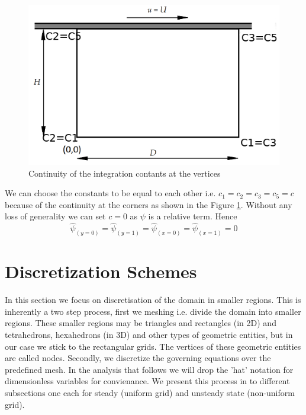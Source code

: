 \documentclass{article}
\begin{document}
\begin{figure}[h!]
\centering
\includegraphics[scale=.4]{cavityFig2.png}
\caption{Continuity of the integration contants at the vertices}
\label{fig:cavityFig2}
\end{figure}

We can choose the constants to be equal to each other i.e.  $c_1=c_2=c_3=c_5=c$ because of the continuity at the corners as shown in the Figure \ref{fig:cavityFig2}. Without any loss of generality we can set $c=0$ as $\psi$ is a relative term.
Hence
\begin{equation}
\hat{\psi}_{(y=0)}=\hat{\psi}_{(y=1)}=\hat{\psi}_{(x=0)}=\hat{\psi}_{(x=1)}=0
\end{equation}




\section{ Discretization Schemes}
In this section we focus on discretisation of the domain in smaller regions. This is inherently a two step process, first we meshing i.e. divide the domain into smaller regions. These smaller regions may be triangles and rectangles (in 2D) and tetrahedrons, hexahedrons (in 3D) and other types of geometric entities, but in our case we stick to the rectangular grids. The vertices of these geometric entities are called nodes. Secondly, we discretize the governing equations over the predefined mesh. In the analysis that follows we will drop the 'hat' notation for dimensionless variables for convienance. We present this process in to different subsections one each for steady (uniform grid) and unsteady state (non-uniform grid).
\end{document}
